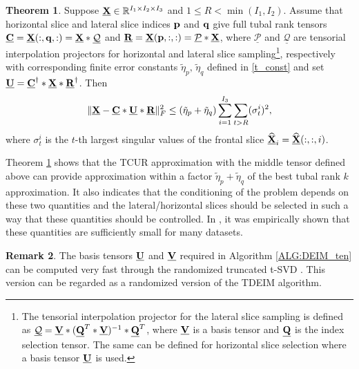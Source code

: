 \documentclass[preprint,12pt]{elsarticle}
\theoremstyle{definition}
\newtheorem{thm}{Theorem}
\newtheorem{rem}[thm]{\bf{Remark}}
\newcommand{\cX}{\underline{\bf X}}
\newcommand{\cC}{\underline{\bf C}}
\newcommand{\cU}{\underline{\bf U}}
\newcommand{\cV}{\underline{\bf V}}
\newcommand{\cR}{\underline{\bf R}}
\newcommand{\C}{{\bf C}}
\newcommand{\Q}{{\bf Q}}
\newcommand{\V}{{\bf V}}
\begin{document}
\begin{thm}\label{thm_tub} \cite{ahmadi2024robust}
Suppose $\cX\in\mathbb{R}^{I_1\times I_2\times I_3}$ and $1\leq R<\min(I_1,I_2)$. Assume that  horizontal slice and lateral slice indices ${\bf p}$ and ${\bf q}$ give full tubal rank tensors $\cC=\cX(:,{\bf q},:)=\cX*\underline{\mathcal Q}$
and $\cR=\cX({\bf p},:,:)={\underline{\mathcal P}}*\cX$, where $\underline{\mathcal{P}}$ and $\underline{\mathcal{Q}}$ are tensorial interpolation projectors for horizontal and lateral slice sampling\footnote{The  tensorial
interpolation projector for the lateral slice sampling is defined as $\underline{\mathcal{Q}}=\underline{\V}*(\underline{\Q}^T*\underline{\V})^{-1}*\underline{\Q}^T$, where $\underline{\V}$ is a basis tensor and $\underline{\Q}$ is the index selection tensor. The same can be defined for horizontal slice selection where a basis tensor $\underline{\bf U}$ is used.}, respectively with corresponding finite error constants $\tilde{\eta}_p,\,\tilde{\eta}_q$ defined in \eqref{t_const} and set $\cU=\underline{\C}^{\dag}*\cX*\cR^{\dag}$. Then
\begin{eqnarray}
    \|\cX-\cC*\cU*\cR\|^2_F\leq (\tilde{\eta}_p+\tilde{\eta}_q)\sum_{i=1}^{I_3}\sum_{t>R}(\sigma^i_{t})^2,
\end{eqnarray} 
where $\sigma^i_{t}$ is the $t$-th largest singular values of the frontal slice $\widehat{\cX}_i=\widehat{\cX}(:,:,i)$.
\end{thm}

Theorem \ref{thm_tub} shows that the TCUR approximation with the middle tensor defined above can provide approximation within a factor $\tilde{\eta}_p+\tilde{\eta}_q$ of the best tubal rank $k$ approximation. It also indicates that the conditioning of the problem depends on these two quantities and the lateral/horizontal slices should be selected in such a way that these quantities should be controlled. In \cite{ahmadi2024robust}, it was empirically shown that these quantities are sufficiently small for many datasets. 

\begin{rem}
The basis tensors $\cU$ and $\cV$ required in Algorithm \ref{ALG:DEIM_ten} can be computed very fast through the randomized truncated t-SVD \cite{zhang2018randomized,ahmadi2022efficient,ahmadi2024randomized}. This version can be regarded as a randomized version of the TDEIM algorithm.
\end{rem}
\end{document}
